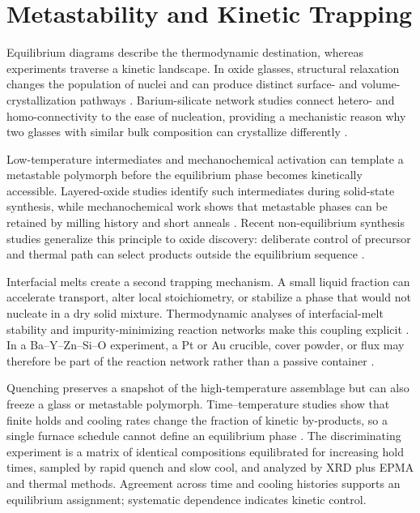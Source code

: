 \section{Metastability and Kinetic Trapping}

Equilibrium diagrams describe the thermodynamic destination, whereas experiments traverse a kinetic landscape. In oxide glasses, structural relaxation changes the population of nuclei and can produce distinct surface- and volume-crystallization pathways \cite{mckenzie2020nucleation,mckenzie2021nucleation,schmelzer2020effects,waurischk2020crystal}. Barium-silicate network studies connect hetero- and homo-connectivity to the ease of nucleation, providing a mechanistic reason why two glasses with similar bulk composition can crystallize differently \cite{moulton2021a,moulton2022a}.

Low-temperature intermediates and mechanochemical activation can template a metastable polymorph before the equilibrium phase becomes kinetically accessible. Layered-oxide studies identify such intermediates during solid-state synthesis, while mechanochemical work shows that metastable phases can be retained by milling history and short anneals \cite{bai2020kinetic,rana2021insights}. Recent non-equilibrium synthesis studies generalize this principle to oxide discovery: deliberate control of precursor and thermal path can select products outside the equilibrium sequence \cite{pitcher2024non,zeng2024selective}.

Interfacial melts create a second trapping mechanism. A small liquid fraction can accelerate transport, alter local stoichiometry, or stabilize a phase that would not nucleate in a dry solid mixture. Thermodynamic analyses of interfacial-melt stability and impurity-minimizing reaction networks make this coupling explicit \cite{zhang2026interfacial,jang2025identification,dhar2026thermodynamic}. In a Ba--Y--Zn--Si--O experiment, a Pt or Au crucible, cover powder, or flux may therefore be part of the reaction network rather than a passive container \cite{thieme2022noble,abdeyazdan2024phase}.

Quenching preserves a snapshot of the high-temperature assemblage but can also freeze a glass or metastable polymorph. Time--temperature studies show that finite holds and cooling rates change the fraction of kinetic by-products, so a single furnace schedule cannot define an equilibrium phase \cite{wang2024optimal,wang2024optimal,walters2026constructing}. The discriminating experiment is a matrix of identical compositions equilibrated for increasing hold times, sampled by rapid quench and slow cool, and analyzed by XRD plus EPMA and thermal methods. Agreement across time and cooling histories supports an equilibrium assignment; systematic dependence indicates kinetic control.
